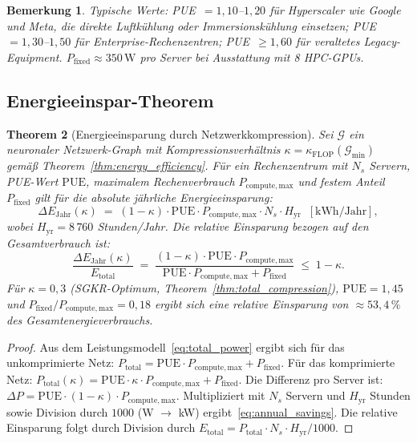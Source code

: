 ﻿\documentclass[12pt, a4paper, openany]{report}
\newtheorem{theorem}{Theorem}[chapter]
\newtheorem{remark}[theorem]{Bemerkung}
\newcommand{\calG}{\mathcal{G}}
\begin{document}
\begin{remark}
Typische Werte: PUE~$= 1{,}10$--$1{,}20$ für Hyperscaler wie Google und
Meta, die direkte Luftkühlung oder Immersionskühlung einsetzen;
PUE~$= 1{,}30$--$1{,}50$ für Enterprise-Rechenzentren;
PUE~$\geq 1{,}60$ für veraltetes Legacy-Equipment.
$P_{\mathrm{fixed}} \approx 350\,\mathrm{W}$ pro Server bei Ausstattung
mit 8 HPC-GPUs.
\end{remark}

\subsection{Energieeinspar-Theorem}

\begin{theorem}[Energieeinsparung durch Netzwerkkompression]
\label{thm:energy_savings}
Sei $\calG$ ein neuronaler Netzwerk-Graph mit Kompressionsverhältnis
$\kappa = \kappa_{\mathrm{FLOP}}(\calG_{\min})$ gemäß
Theorem~\ref{thm:energy_efficiency}.  Für ein Rechenzentrum mit
$N_s$ Servern, PUE-Wert $\mathrm{PUE}$, maximalem Rechenverbrauch
$P_{\mathrm{compute,max}}$ und festem Anteil $P_{\mathrm{fixed}}$ gilt für
die absolute jährliche Energieeinsparung:
\begin{equation}
  \label{eq:annual_savings}
  \Delta E_{\mathrm{Jahr}}(\kappa)
  \;=\;
  (1 - \kappa) \cdot \mathrm{PUE} \cdot P_{\mathrm{compute,max}} \cdot N_s \cdot H_{\mathrm{yr}}
  \;\;[\mathrm{kWh/Jahr}],
\end{equation}
wobei $H_{\mathrm{yr}} = 8\,760$ Stunden/Jahr.  Die \emph{relative Einsparung}
bezogen auf den Gesamtverbrauch ist:
\begin{equation}
  \label{eq:relative_savings}
  \frac{\Delta E_{\mathrm{Jahr}}(\kappa)}{E_{\mathrm{total}}}
  \;=\;
  \frac{(1-\kappa)\cdot\mathrm{PUE}\cdot P_{\mathrm{compute,max}}}
       {\mathrm{PUE}\cdot P_{\mathrm{compute,max}} + P_{\mathrm{fixed}}}
  \;\leq\; 1 - \kappa.
\end{equation}
Für $\kappa = 0{,}3$ (SGKR-Optimum, Theorem~\ref{thm:total_compression}),
$\mathrm{PUE} = 1{,}45$ und $P_{\mathrm{fixed}}/P_{\mathrm{compute,max}} = 0{,}18$
ergibt sich eine relative Einsparung von
$\approx 53{,}4\,\%$ des Gesamtenergieverbrauchs.
\end{theorem}

\begin{proof}
Aus dem Leistungsmodell~\eqref{eq:total_power} ergibt sich für das
unkomprimierte Netz:
$P_{\mathrm{total}} = \mathrm{PUE} \cdot P_{\mathrm{compute,max}} + P_{\mathrm{fixed}}$.
Für das komprimierte Netz:
$P_{\mathrm{total}}(\kappa) = \mathrm{PUE} \cdot \kappa \cdot P_{\mathrm{compute,max}} + P_{\mathrm{fixed}}$.
Die Differenz pro Server ist:
$\Delta P = \mathrm{PUE} \cdot (1-\kappa) \cdot P_{\mathrm{compute,max}}$.
Multipliziert mit $N_s$ Servern und $H_{\mathrm{yr}}$ Stunden sowie
Division durch $1000$ (W $\to$ kW) ergibt~\eqref{eq:annual_savings}.
Die relative Einsparung folgt durch Division durch
$E_{\mathrm{total}} = P_{\mathrm{total}} \cdot N_s \cdot H_{\mathrm{yr}} / 1000$.
\end{proof}
\end{document}
